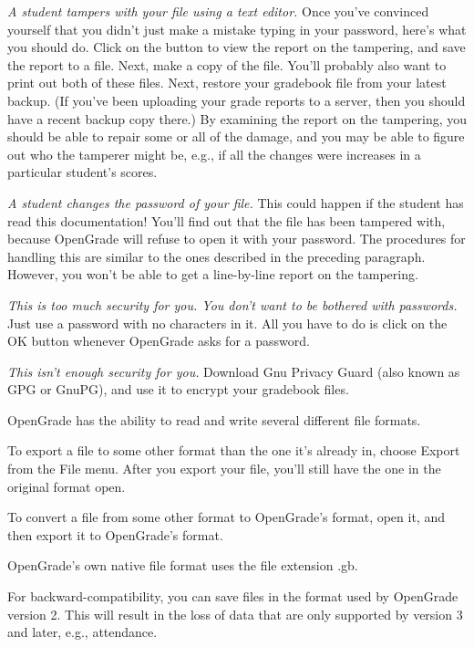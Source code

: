 \documentclass{opengrade_doc}
\begin{document}
\emph{A student tampers with your file using a text editor.\/}
Once you've convinced yourself that you didn't just make a mistake typing
in your password, here's what you should do. Click on the button to view
the report on the tampering, and save the report to a file.
Next, make a copy of
the file. You'll probably also want to print out both of these files.
Next, restore your gradebook file from your latest backup. (If you've been uploading
your grade reports to a server, then you should have a recent backup copy
there.) By examining the report on the tampering, you should be able to
repair some or all of the damage, and you may be able to figure out who
the tamperer might be, e.g., if all the changes were increases in a
particular student's scores.

\emph{A student changes the password of your file.\/}
This could happen if the student has read this documentation! You'll find
out that the file has been tampered with, because OpenGrade will refuse to
open it with your password. The procedures for handling this are
similar to the ones described in the preceding paragraph. However, you won't
be able to get a line-by-line report on the tampering.

\emph{This is too much security for you.
You don't want to be bothered with passwords.\/}
Just use a password with no characters in it. All you have to do is
click on the OK button whenever OpenGrade asks for a password.

\emph{This isn't enough security for you.\/}
Download Gnu Privacy Guard (also known as GPG or GnuPG), and use it
to encrypt your gradebook files.

\label{import-export}
OpenGrade has the ability to read and write several different file formats.

To export a file to some other format than the one it's already in, choose Export
from the File menu. After you export your file, you'll still have the one in the
original format open.

To convert a file from some other format to OpenGrade's format, open it, and then
export it to OpenGrade's format.


OpenGrade's own native file format uses the file extension .gb. 


For backward-compatibility, you can save files in the format used by OpenGrade version 2.
This will result in the loss of data that are only supported by version 3 and later, e.g., attendance.
\end{document}
